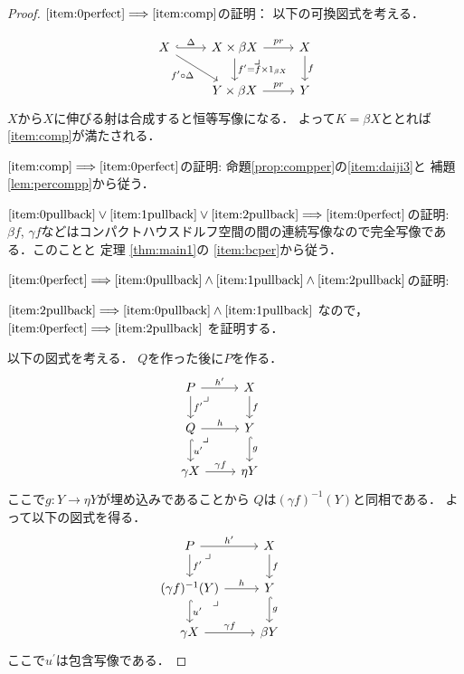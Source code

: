 \documentclass[leqno, a4paper, 12pt, dvipdfmx]{jsarticle}
\newcommand{\To}{\Longrightarrow}
\begin{document}
\begin{proof}

$\ref{item:0perfect}\To \ref{item:comp}$の証明：
以下の可換図式を考える．


\[
\begin{tikzcd}
X \arrow[r, hook, "\Delta"] \arrow[dr, "f^{\prime}\circ \Delta"']& X\times \beta X \arrow[r, "pr"] \arrow[d, "f^{\prime}=f\times 1_{\beta X}"] \arrow[dr, phantom, "\lrcorner", very near start]
& X \arrow[d,"f"] \\
& Y\times \beta X \arrow[r,"pr"] & Y
\end{tikzcd}
\]
$X$から$X$に伸びる射は合成すると恒等写像になる．
よって$K=\beta X$ととれば
\ref{item:comp}が満たされる．


$\ref{item:comp}\To \ref{item:0perfect}$の証明:
命題\ref{prop:compper}の\ref{item:daiji3}と
補題\ref{lem:percompp}から従う．

$\ref{item:0pullback}\lor \ref{item:1pullback}\lor \ref{item:2pullback}\To \ref{item:0perfect}$の証明:
$\beta f$, $\gamma f$などはコンパクトハウスドルフ空間の間の連続写像なので完全写像である．このことと
定理
\ref{thm:main1}の
\ref{item:bcper}から従う．







$\ref{item:0perfect}\To \ref{item:0pullback}\land \ref{item:1pullback}\land \ref{item:2pullback}$の証明:

$\ref{item:2pullback}\To \ref{item:0pullback}\land\ref{item:1pullback}$
なので，
$\ref{item:0perfect}\To \ref{item:2pullback}$
を証明する．



以下の図式を考える．
$Q$を作った後に$P$を作る．
\[
\begin{tikzcd}
P \arrow[r, "h^{\prime}"] \arrow[d, "f^{\prime}"] \arrow[dr, phantom, "\lrcorner", very near start]
& X \arrow[d,"f"] & \\
Q  \arrow[dr, phantom, "\lrcorner", very near start]\arrow[r,"h"] \arrow[d, hook, "u^{\prime}"] & Y \arrow[d, hook, "g"] \\
\gamma X\arrow[r,"\gamma f"] &  \eta Y
\end{tikzcd}
\]
ここで$g\colon Y\to \eta Y$が埋め込みであることから
$Q$は$(\gamma f)^{-1}(Y)$と同相である．
よって以下の図式を得る．
\[
\begin{tikzcd}
P \arrow[r, "h^{\prime}"] \arrow[d, "f^{\prime}"] \arrow[dr, phantom, "\lrcorner", very near start]
& X \arrow[d,"f"] & \\
(\gamma f)^{-1}(Y)  \arrow[dr, phantom, "\lrcorner", very near start]\arrow[r,"h"] \arrow[d, hook, "u^{\prime}"] & Y \arrow[d, hook, "g"] \\
\gamma X\arrow[r,"\gamma f"] &  \beta Y
\end{tikzcd}
\]
ここで$u^{\prime}$は包含写像である．


\end{proof}
\end{document}
